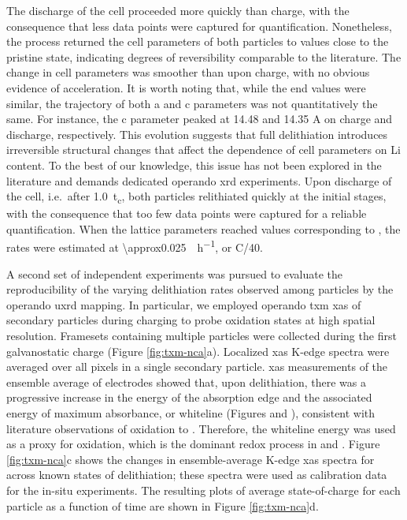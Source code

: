 \documentclass{article}
\begin{document}
The discharge of the cell proceeded more quickly than charge, with the
consequence that less data points were captured for
quantification. Nonetheless, the process returned the cell parameters
of both particles to values close to the pristine state, indicating
degrees of reversibility comparable to the
literature.\cite{robert2015} The change in cell parameters was
smoother than upon charge, with no obvious evidence of
acceleration. It is worth noting that, while the end values were
similar, the trajectory of both a and c parameters was not
quantitatively the same. For instance, the c parameter peaked at 14.48
and 14.35 A on charge and discharge, respectively. This evolution
suggests that full delithiation introduces irreversible structural
changes that affect the dependence of cell parameters on Li
content. To the best of our knowledge, this issue has not been
explored in the literature and demands dedicated operando \gls{xrd}
experiments. Upon discharge of the cell, i.e.\ after \SI{1.0}{t_c},
both particles relithiated quickly at the initial stages, with the
consequence that too few data points were captured for a reliable
quantification. When the lattice parameters reached values
corresponding to , the rates were estimated at
\SI{\approx0.025}{\per\hour}, or C/40. 




A second set of independent experiments was pursued to evaluate the
reproducibility of the varying delithiation rates observed among
particles by the operando \gls{uxrd} mapping. In particular, we
employed operando \Gls{txm} \gls{xas} of \nca{} secondary particles
during charging to probe  oxidation states at high spatial
resolution. Framesets containing multiple particles were collected
during the first galvanostatic charge (Figure
\ref{fig:txm-nca}a). Localized \gls{xas} K-edge spectra were averaged
over all pixels in a single secondary particle. \gls{xas} measurements
of the ensemble average of electrodes showed that, upon delithiation,
there was a progressive increase in the energy of the absorption edge
and the associated energy of maximum absorbance, or whiteline (Figures
 and ), consistent
with literature observations of  oxidation to
\cite{deb2005,muto2009}. Therefore, the whiteline energy
was used as a proxy for  oxidation, which is the dominant redox
process in \nca{} and \nmc{}. Figure \ref{fig:txm-nca}c shows the
changes in ensemble-average  K-edge \gls{xas} spectra for
\nca{} across known states of delithiation; these spectra were used as
calibration data for the in-situ experiments. The resulting plots of
average state-of-charge for each particle as a function of time are
shown in Figure \ref{fig:txm-nca}d.
\end{document}

